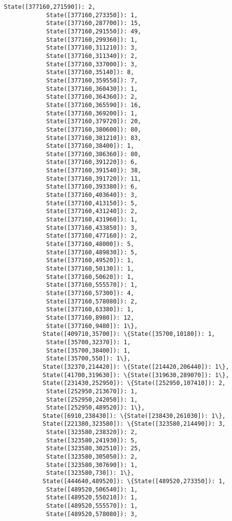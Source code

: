 \documentclass[11pt]{article}
\begin{document}
\begin{Verbatim}[commandchars=\\\{\}]
            State([377160,271590]): 2,
            State([377160,273350]): 1,
            State([377160,287700]): 15,
            State([377160,291550]): 49,
            State([377160,299360]): 1,
            State([377160,311210]): 3,
            State([377160,311340]): 2,
            State([377160,337000]): 3,
            State([377160,35140]): 8,
            State([377160,359550]): 7,
            State([377160,360430]): 1,
            State([377160,364360]): 2,
            State([377160,365590]): 16,
            State([377160,369200]): 1,
            State([377160,379720]): 20,
            State([377160,380600]): 80,
            State([377160,381210]): 83,
            State([377160,38400]): 1,
            State([377160,386360]): 80,
            State([377160,391220]): 6,
            State([377160,391540]): 38,
            State([377160,391720]): 11,
            State([377160,393380]): 6,
            State([377160,403640]): 3,
            State([377160,413150]): 5,
            State([377160,431240]): 2,
            State([377160,431960]): 1,
            State([377160,433850]): 3,
            State([377160,477160]): 2,
            State([377160,48000]): 5,
            State([377160,489830]): 5,
            State([377160,49520]): 1,
            State([377160,50130]): 1,
            State([377160,50620]): 1,
            State([377160,555570]): 1,
            State([377160,57300]): 4,
            State([377160,578080]): 2,
            State([377160,63380]): 1,
            State([377160,8980]): 12,
            State([377160,9480]): 1\},
           State([409710,35700]): \{State([35700,10180]): 1,
            State([35700,32370]): 1,
            State([35700,38400]): 1,
            State([35700,550]): 1\},
           State([32370,214420]): \{State([214420,206440]): 1\},
           State([41700,319630]): \{State([319630,289070]): 1\},
           State([231430,252950]): \{State([252950,107410]): 2,
            State([252950,213670]): 1,
            State([252950,242050]): 1,
            State([252950,489520]): 1\},
           State([6910,238430]): \{State([238430,261030]): 1\},
           State([221380,323580]): \{State([323580,214490]): 3,
            State([323580,238320]): 2,
            State([323580,241930]): 5,
            State([323580,302510]): 25,
            State([323580,305050]): 2,
            State([323580,307690]): 1,
            State([323580,730]): 1\},
           State([444640,489520]): \{State([489520,273350]): 1,
            State([489520,506540]): 1,
            State([489520,550210]): 1,
            State([489520,555570]): 1,
            State([489520,578080]): 3,

\end{Verbatim}
\end{document}
